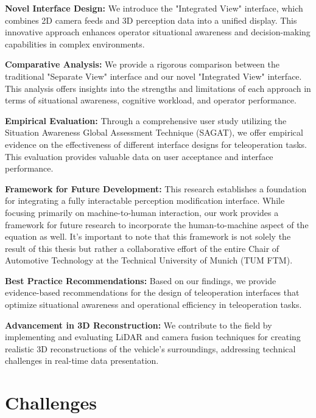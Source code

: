\textbf{Novel Interface Design:}
We introduce the "Integrated View" interface, which combines 2D camera feeds and 3D perception data into a unified display. This innovative approach
enhances operator situational awareness and decision-making capabilities in complex environments.

\textbf{Comparative Analysis:}
We provide a rigorous comparison between the traditional
"Separate View" interface and our novel "Integrated View" interface. This analysis offers
insights into the strengths and limitations of each approach in terms of situational
awareness, cognitive workload, and operator performance.

\textbf{Empirical Evaluation:}
Through a comprehensive user study utilizing the Situation Awareness Global Assessment Technique (SAGAT)\cite{endsley1988sagat}, we offer empirical evidence on the effectiveness of different interface designs for teleoperation tasks. This evaluation provides
valuable data on user acceptance and interface performance.

\textbf{Framework for Future Development:}
This research establishes a foundation for
integrating a fully interactable perception modification interface. While focusing
primarily on machine-to-human interaction, our work provides a framework for future
research to incorporate the human-to-machine aspect of the equation as well. It's
important to note that this framework is not solely the result of this thesis but rather a collaborative effort of the entire Chair of Automotive Technology at the Technical
University of Munich (TUM FTM).

\textbf{Best Practice Recommendations:}
Based on our findings, we provide evidence-based recommendations for the design of teleoperation interfaces that optimize situational awareness and operational efficiency in teleoperation tasks.

\textbf{Advancement in 3D Reconstruction:}
We contribute to the field by implementing and evaluating LiDAR and camera fusion techniques for creating realistic 3D reconstructions of the vehicle's surroundings, addressing technical challenges in real-time data presentation.

\section{Challenges}

